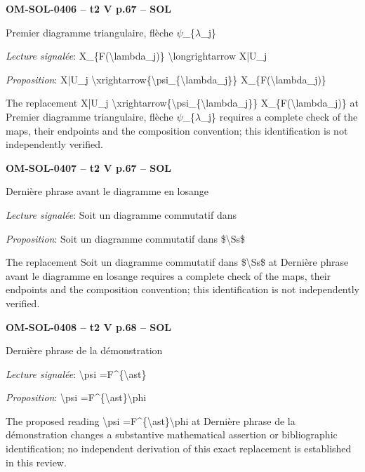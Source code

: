 \par\noindent\textbf{OM-SOL-0406 -- t2 V p.67 -- SOL}\par
Premier diagramme triangulaire, flèche \ensuremath{\psi}\_\{\ensuremath{\lambda}\_j\}\par
\emph{Lecture signalée}: X\_\{F(\textbackslash{}lambda\_j)\} \textbackslash{}longrightarrow X|U\_j\par
\emph{Proposition}: X|U\_j \textbackslash{}xrightarrow\{\textbackslash{}psi\_\{\textbackslash{}lambda\_j\}\} X\_\{F(\textbackslash{}lambda\_j)\}\par
The replacement X|U\_j \textbackslash{}xrightarrow\{\textbackslash{}psi\_\{\textbackslash{}lambda\_j\}\} X\_\{F(\textbackslash{}lambda\_j)\} at Premier diagramme triangulaire, flèche \ensuremath{\psi}\_\{\ensuremath{\lambda}\_j\} requires a complete check of the maps, their endpoints and the composition convention; this identification is not independently verified.\par
\par\noindent\textbf{OM-SOL-0407 -- t2 V p.67 -- SOL}\par
Dernière phrase avant le diagramme en losange\par
\emph{Lecture signalée}: Soit un diagramme commutatif dans\par
\emph{Proposition}: Soit un diagramme commutatif dans \$\textbackslash{}Ss\$\par
The replacement Soit un diagramme commutatif dans \$\textbackslash{}Ss\$ at Dernière phrase avant le diagramme en losange requires a complete check of the maps, their endpoints and the composition convention; this identification is not independently verified.\par
\par\noindent\textbf{OM-SOL-0408 -- t2 V p.68 -- SOL}\par
Dernière phrase de la démonstration\par
\emph{Lecture signalée}: \textbackslash{}psi =\allowbreak  F\textasciicircum{}\{\textbackslash{}ast\}\par
\emph{Proposition}: \textbackslash{}psi =\allowbreak  F\textasciicircum{}\{\textbackslash{}ast\}\textbackslash{}phi\par
The proposed reading \textbackslash{}psi =\allowbreak  F\textasciicircum{}\{\textbackslash{}ast\}\textbackslash{}phi at Dernière phrase de la démonstration changes a substantive mathematical assertion or bibliographic identification; no independent derivation of this exact replacement is established in this review.\par
